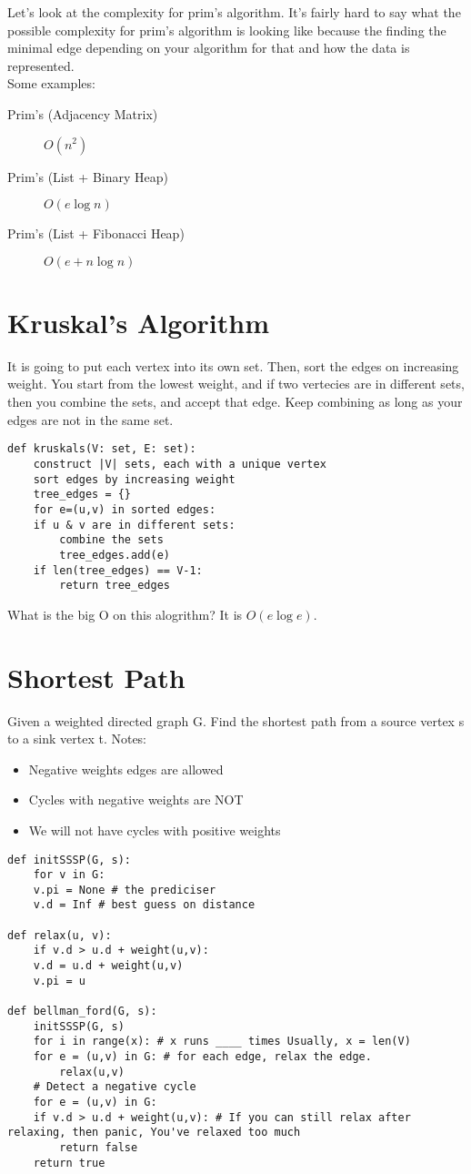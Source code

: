 \documentclass{article}
\begin{document}
Let's look at the complexity for prim's algorithm. It's fairly hard to say what the possible complexity for prim's algorithm is looking like because the finding the minimal edge depending on your algorithm for that and how the data is represented.\\
Some examples:\\
\begin{description}
\item[{Prim's (Adjacency Matrix)}] \(O(n^2)\)
\item[{Prim's (List + Binary Heap)}] \(O(e \log n)\)
\item[{Prim's (List + Fibonacci Heap)}] \(O(e + n \log n)\)
\end{description}

\section{Kruskal's Algorithm}
\label{sec:orge27ef33}
It is going to put each vertex into its own set. Then, sort the edges on increasing weight. You start from the lowest weight, and if two vertecies are in different sets, then you combine the sets, and accept that edge. Keep combining as long as your edges are not in the same set.

\begin{verbatim}
def kruskals(V: set, E: set):
    construct |V| sets, each with a unique vertex
    sort edges by increasing weight
    tree_edges = {}
    for e=(u,v) in sorted edges:
	if u & v are in different sets:
	    combine the sets
	    tree_edges.add(e)
	if len(tree_edges) == V-1:
	    return tree_edges
\end{verbatim}

What is the big O on this alogrithm? It is \(O(e \log e)\).

\section{Shortest Path}
\label{sec:orgef2c086}
Given a weighted directed graph G. Find the shortest path from a source vertex s to a sink vertex t.
Notes:
\begin{itemize}
\item Negative weights edges are allowed
\item Cycles with negative weights are NOT
\item We will not have cycles with positive weights
\end{itemize}

\begin{verbatim}
def initSSSP(G, s):
    for v in G:
	v.pi = None # the prediciser
	v.d = Inf # best guess on distance

def relax(u, v):
    if v.d > u.d + weight(u,v):
	v.d = u.d + weight(u,v)
	v.pi = u

def bellman_ford(G, s):
    initSSSP(G, s)
    for i in range(x): # x runs ____ times Usually, x = len(V)
	for e = (u,v) in G: # for each edge, relax the edge.
	    relax(u,v)
    # Detect a negative cycle
    for e = (u,v) in G:
	if v.d > u.d + weight(u,v): # If you can still relax after relaxing, then panic, You've relaxed too much
	    return false
    return true
\end{verbatim}
\end{document}
